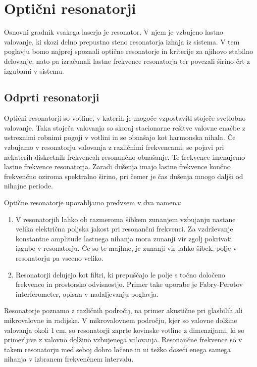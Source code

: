 
\chapter{Optični resonatorji}
Osnovni gradnik vsakega laserja je resonator. V njem je vzbujeno lastno valovanje,
ki skozi delno prepustno steno resonatorja izhaja iz sistema. V tem poglavju bomo 
najprej spoznali optične resonatorje in kriterije za njihovo stabilno delovanje,
nato pa izračunali lastne frekvence resonatorja ter povezali širino črt z izgubami v sistemu. 

\section{Odprti resonatorji}
Optični resonatorji so votline, v katerih je mogoče 
vzpostaviti stoječe svetlobno valovanje. Taka stoječa valovanja so skoraj 
stacionarne rešitve valovne enačbe z ustreznimi robnimi pogoji v votlini 
in se obnašajo kot harmonska nihala. Če vzbujamo v resonatorju valovanja z 
različnimi frekvencami, se pojavi pri nekaterih diskretnih frekvencah resonančno
obnašanje. Te frekvence imenujemo lastne frekvence
resonatorja. Zaradi dušenja imajo lastne frekvence končno frekvenčno oziroma spektralno 
širino, pri čemer je čas dušenja mnogo daljši od nihajne periode. 

Optične resonatorje uporabljamo predvsem v dva namena:
\begin{enumerate}
\item V resonatorjih lahko ob razmeroma šibkem zunanjem vzbujanju nastane velika
električna poljska jakost pri resonančni frekvenci. Za vzdrževanje
konstantne amplitude lastnega nihanja mora zunanji vir zgolj pokrivati izgube
v resonatorju. Če so te majhne, je zunanji vir lahko šibek, polje
v resonatorju pa vseeno veliko.\\
\item Resonatorji delujejo kot filtri, ki prepuščajo le polje s točno  
določeno frekvenco in prostorsko odvisnostjo. Primer take uporabe je 
Fabry-Perotov interferometer, opisan 
v nadaljevanju poglavja. 
\end{enumerate}

Resonatorje poznamo z različnih področij, na primer akustične pri glasbilih ali 
mikrovalovne in radijske. V mikrovalovnem področju, kjer so valovne dolžine valovanja
okoli $1~\si{\centi\metre}$, 
so resonatorji zaprte kovinske votline z dimenzijami, ki so primerljive z 
valovno dolžino vzbujenega valovanja. Resonančne frekvence so v takem resonatorju 
med seboj dobro ločene in ni težko doseči enega samega nihanja v izbranem 
frekvenčnem intervalu.

